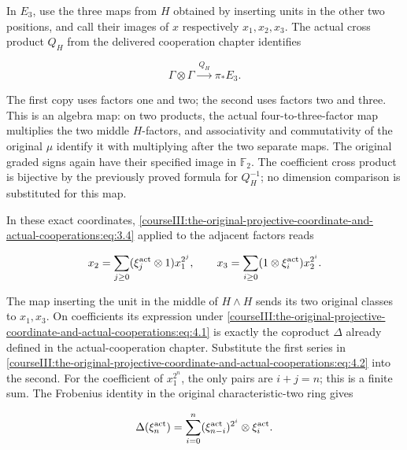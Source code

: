 \label{courseIII:the-original-projective-coordinate-and-actual-cooperations:section-4}\label{courseIII:projective-coop:4}

In \(E_3\), use the three maps from \(H\) obtained by inserting units in the other two positions, and call their images of \(x\) respectively \(x_1,x_2,x_3\). The actual cross product \(Q_H\) from the delivered cooperation chapter identifies

\begin{equation}
\Gamma\otimes\Gamma\xrightarrow{\ Q_H\ }\pi_*E_3.
 \label{courseIII:the-original-projective-coordinate-and-actual-cooperations:eq:4.1}
\end{equation}

The first copy uses factors one and two; the second uses factors two and three. This is an algebra map: on two products, the actual four-to-three-factor map multiplies the two middle \(H\)-factors, and associativity and commutativity of the original \(\mu\) identify it with multiplying after the two separate maps. The original graded signs again have their specified image in \(\mathbb F_2\). The coefficient cross product is bijective by the previously proved formula for \(Q_H^{-1}\); no dimension comparison is substituted for this map.

In these exact coordinates, \eqref{courseIII:the-original-projective-coordinate-and-actual-cooperations:eq:3.4} applied to the adjacent factors reads

\begin{equation}
x_2=\sum_{j\geq0}(\xi_j^{\rm act}\otimes1)x_1^{2^j},
 \qquad
 x_3=\sum_{i\geq0}(1\otimes\xi_i^{\rm act})x_2^{2^i}.
 \label{courseIII:the-original-projective-coordinate-and-actual-cooperations:eq:4.2}
\end{equation}

The map inserting the unit in the middle of \(H\wedge H\) sends its two original classes to \(x_1,x_3\). On coefficients its expression under \eqref{courseIII:the-original-projective-coordinate-and-actual-cooperations:eq:4.1} is exactly the coproduct \(\Delta\) already defined in the actual-cooperation chapter. Substitute the first series in \eqref{courseIII:the-original-projective-coordinate-and-actual-cooperations:eq:4.2} into the second. For the coefficient of \(x_1^{2^n}\), the only pairs are \(i+j=n\); this is a finite sum. The Frobenius identity in the original characteristic-two ring gives

\begin{equation}
\Delta(\xi_n^{\rm act})
   =\sum_{i=0}^n(\xi_{n-i}^{\rm act})^{2^i}
                         \otimes\xi_i^{\rm act}.
 \label{courseIII:the-original-projective-coordinate-and-actual-cooperations:eq:4.3}
\end{equation}

